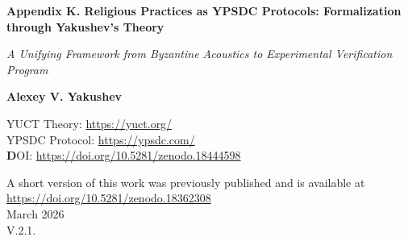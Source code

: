 \documentclass[12pt,a4paper]{article}
\begin{document}
	
	\begin{titlepage}
		\begin{center}
			\vspace*{0cm}
			
			\Huge\textbf{Appendix K. Religious Practices as YPSDC Protocols: Formalization through Yakushev's Theory}
			
			\vspace{1cm}
			
			\small\textit{A Unifying Framework from Byzantine Acoustics to Experimental Verification Program}
			
			\vspace{0.5cm}
			
			\small\textbf{Alexey V. Yakushev}
			
			\vspace{0cm}
			
			YUCT Theory: \url{https://yuct.org/}\\
			YPSDC Protocol: \url{https://ypsdc.com/}\\
			
			
			\vspace{2cm}
			\textbf DOI: \url{https://doi.org/10.5281/zenodo.18444598}\\
			
			\vspace{1cm}
			
			\vspace{0cm}
			\large 
			A short version of this work was previously published and is available at\\ \url{https://doi.org/10.5281/zenodo.18362308}\\
			\vspace{1cm}
			March 2026 \\ \large V.2.1.
			\newpage
			\begin{abstract}
				\noindent
				This document presents a comprehensive formalization of religious practices through the lens of Yakushev's Unified Coordination Theory (YUCT) and YPSDC (Yakushev Protocol for Synchronous Distributed Coordination). Part 1 demonstrates how religious rituals function as highly optimized coordination protocols using pre-distributed dictionaries, with Byzantine church acoustics serving as a paradigmatic example of architectural optimization for coordination efficiency. Part 2 outlines an extreme unification power of YUCT framework and presents a detailed research program for experimental verification, emphasizing student research as the cornerstone for scientific validation. The framework provides measurable metrics ($K_{\mathrm{eff}}$), testable predictions, and cross-disciplinary applications from physics and biology to sociology and religious studies.
			\end{abstract}
			

\end{center}
\end{titlepage}
\end{document}
